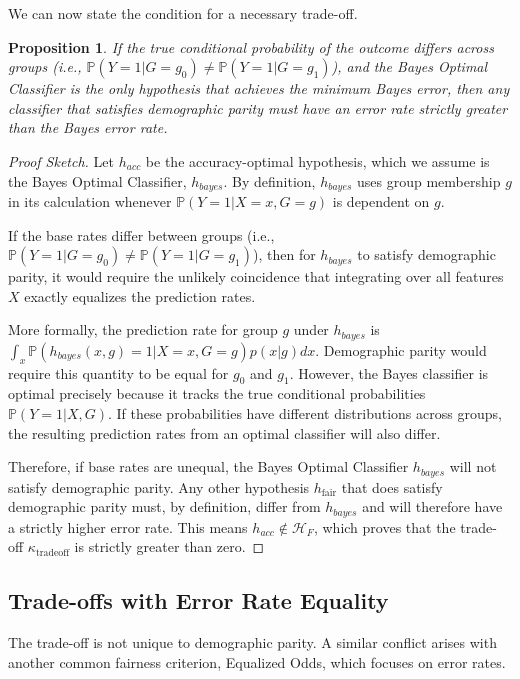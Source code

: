 \documentclass[12pt,a4paper]{article}
\newtheorem{proposition}{Proposition}
\theoremstyle{definition}
\theoremstyle{remark}
\begin{document}
We can now state the condition for a necessary trade-off.

\begin{proposition}
If the true conditional probability of the outcome differs across groups (i.e., $\mathbb{P}(Y=1 | G=g_0) \neq \mathbb{P}(Y=1 | G=g_1)$), and the Bayes Optimal Classifier is the only hypothesis that achieves the minimum Bayes error, then any classifier that satisfies demographic parity must have an error rate strictly greater than the Bayes error rate.
\end{proposition}

\begin{proof}[Proof Sketch]
Let $h_{acc}$ be the accuracy-optimal hypothesis, which we assume is the Bayes Optimal Classifier, $h_{bayes}$. By definition, $h_{bayes}$ uses group membership $g$ in its calculation whenever $\mathbb{P}(Y=1 | X=x, G=g)$ is dependent on $g$.

If the base rates differ between groups (i.e., $\mathbb{P}(Y=1|G=g_0) \neq \mathbb{P}(Y=1|G=g_1)$), then for $h_{bayes}$ to satisfy demographic parity, it would require the unlikely coincidence that integrating over all features $X$ exactly equalizes the prediction rates. 

More formally, the prediction rate for group $g$ under $h_{bayes}$ is $\int_x \mathbb{P}(h_{bayes}(x,g)=1 | X=x, G=g) p(x|g) dx$. Demographic parity would require this quantity to be equal for $g_0$ and $g_1$. However, the Bayes classifier is optimal precisely because it tracks the true conditional probabilities $\mathbb{P}(Y=1|X,G)$. If these probabilities have different distributions across groups, the resulting prediction rates from an optimal classifier will also differ.

Therefore, if base rates are unequal, the Bayes Optimal Classifier $h_{bayes}$ will not satisfy demographic parity. Any other hypothesis $h_{\text{fair}}$ that does satisfy demographic parity must, by definition, differ from $h_{bayes}$ and will therefore have a strictly higher error rate. This means $h_{acc} \notin \mathcal{H}_F$, which proves that the trade-off $\kappa_{\text{tradeoff}}$ is strictly greater than zero.
\end{proof}

\subsection{Trade-offs with Error Rate Equality}

The trade-off is not unique to demographic parity. A similar conflict arises with another common fairness criterion, Equalized Odds, which focuses on error rates.
\end{document}
